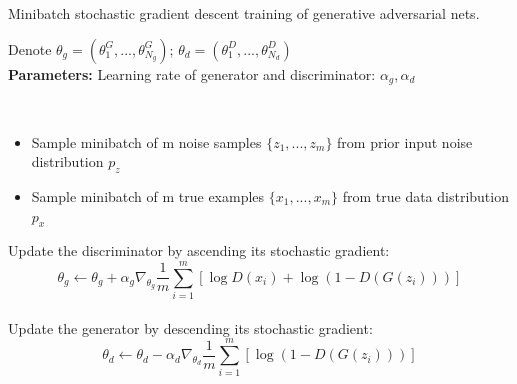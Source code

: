 \begin{algorithm}
\caption{Minibatch stochastic gradient descent training of generative adversarial nets.}\label{alg:grad_d}
Denote $\theta_g = (\theta_1^G,...,\theta_{N_g}^G)$; $\theta_d = (\theta_1^D,...,\theta_{N_d}^D)$\\
\textbf{Parameters: } Learning rate of generator and discriminator: $\alpha_g, \alpha_d$
\begin{algorithmic}
\do \\
\begin{itemize}
\item  Sample minibatch of m noise samples $\{z_1 , ..., z_m\}$ from prior input noise distribution $p_z$
\item  Sample minibatch of m true examples $\{x_1 , ..., x_m\}$ from true data distribution $p_x$
\end{itemize}
Update the discriminator by ascending its stochastic gradient:
\State $$\theta_g \gets \theta_g +\alpha_g \nabla_{\theta_g} \frac{1}{m}\sum_{i = 1}^{m}[\log D(x_i)+\log(1-D(G(z_i)))]$$\\
Update the generator by descending its stochastic gradient:
\State $$\theta_d \gets \theta_d -\alpha_d \nabla_{\theta_d} \frac{1}{m}\sum_{i = 1}^{m}[\log (1-D(G(z_i)))]$$
\EndFor
\end{algorithmic}
\end{algorithm}

\newpage
